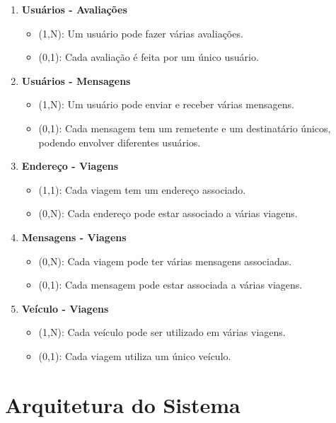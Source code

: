 \begin{enumerate}
	\item \textbf{Usuários - Avaliações}
	\begin{itemize}
		\item (1,N): Um usuário pode fazer várias avaliações.
		\item (0,1): Cada avaliação é feita por um único usuário.
	\end{itemize}
	
	\item \textbf{Usuários - Mensagens}
	\begin{itemize}
		\item (1,N): Um usuário pode enviar e receber várias mensagens.
		\item (0,1): Cada mensagem tem um remetente e um destinatário únicos, podendo envolver diferentes usuários.
	\end{itemize}
	
	\item \textbf{Endereço - Viagens}
	\begin{itemize}
		\item (1,1): Cada viagem tem um endereço associado.
		\item (0,N): Cada endereço pode estar associado a várias viagens.
	\end{itemize}
	
	\item \textbf{Mensagens - Viagens}
	\begin{itemize}
		\item (0,N): Cada viagem pode ter várias mensagens associadas.
		\item (0,1): Cada mensagem pode estar associada a várias viagens.
	\end{itemize}
	
	\item \textbf{Veículo - Viagens}
	\begin{itemize}
		\item (1,N): Cada veículo pode ser utilizado em várias viagens.
		\item (0,1): Cada viagem utiliza um único veículo.
	\end{itemize}
\end{enumerate}




\section{Arquitetura do Sistema}

